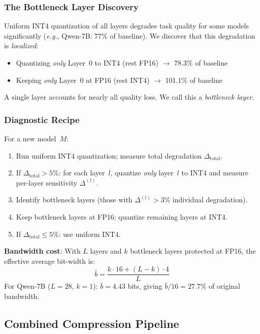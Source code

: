 \documentclass[conference]{IEEEtran}
\newcommand{\eg}{\textit{e.g.}\xspace}
\begin{document}
\subsubsection{The Bottleneck Layer Discovery}

Uniform INT4 quantization of all layers degrades task quality for some models significantly (\eg, Qwen-7B: 77\% of baseline).
We discover that this degradation is \emph{localized}:
\begin{itemize}
    \item Quantizing \emph{only} Layer~0 to INT4 (rest FP16) $\to$ 78.3\% of baseline
    \item Keeping \emph{only} Layer~0 at FP16 (rest INT4) $\to$ 101.1\% of baseline
\end{itemize}
A single layer accounts for nearly all quality loss. We call this a \emph{bottleneck layer}.

\subsubsection{Diagnostic Recipe}

For a new model~$M$:
\begin{enumerate}
    \item Run uniform INT4 quantization; measure total degradation $\Delta_{\text{total}}$.
    \item If $\Delta_{\text{total}} > 5\%$: for each layer~$l$, quantize \emph{only} layer~$l$ to INT4 and measure per-layer sensitivity $\Delta^{(l)}$.
    \item Identify bottleneck layers (those with $\Delta^{(l)} > 3\%$ individual degradation).
    \item Keep bottleneck layers at FP16; quantize remaining layers at INT4.
    \item If $\Delta_{\text{total}} \leq 5\%$: use uniform INT4.
\end{enumerate}

\textbf{Bandwidth cost}: With $L$ layers and $k$ bottleneck layers protected at FP16, the effective average bit-width is:
\begin{equation}
    \bar{b} = \frac{k \cdot 16 + (L-k) \cdot 4}{L}
\end{equation}
For Qwen-7B ($L=28$, $k=1$): $\bar{b} = 4.43$ bits, giving $\bar{b}/16 = 27.7\%$ of original bandwidth.

\subsection{Combined Compression Pipeline}
\end{document}
